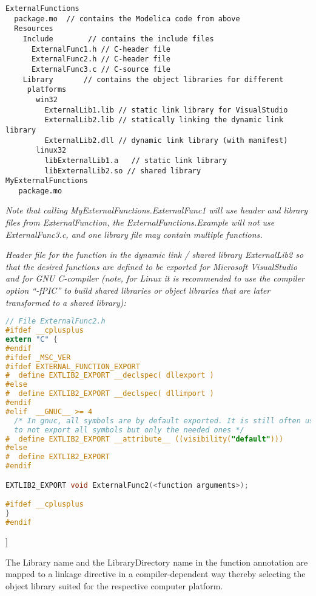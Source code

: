 \textbf{}

\begin{lstlisting}[language=modelica]
ExternalFunctions
  package.mo  // contains the Modelica code from above
  Resources
    Include        // contains the include files
      ExternalFunc1.h // C-header file
      ExternalFunc2.h // C-header file
      ExternalFunc3.c // C-source file
    Library       // contains the object libraries for different
     platforms
       win32
         ExternalLib1.lib // static link library for VisualStudio
         ExternalLib2.lib // statically linking the dynamic link library
         ExternalLib2.dll // dynamic link library (with manifest)
       linux32
         libExternalLib1.a   // static link library
         libExternalLib2.so // shared library
MyExternalFunctions
   package.mo
\end{lstlisting}
\emph{Note that calling MyExternalFunctions.ExternalFunc1 will use
header and library files from ExternalFunction, the ExternalFunctions.Example will not use ExternalFunc3.c,
and one library file may contain multiple functions.}

\emph{Header file for the function in the dynamic link / shared library
ExternalLib2 so that the desired functions are defined to be exported
for Microsoft VisualStudio and for GNU C-compiler (note, for Linux it is
recommended to use the compiler option ``-fPIC'' to build shared
libraries or object libraries that are later transformed to a shared
library):}

\begin{lstlisting}[language=C]
// File ExternalFunc2.h
#ifdef __cplusplus
extern "C" {
#endif
#ifdef _MSC_VER
#ifdef EXTERNAL_FUNCTION_EXPORT
#  define EXTLIB2_EXPORT __declspec( dllexport )
#else
#  define EXTLIB2_EXPORT __declspec( dllimport )
#endif
#elif  __GNUC__ >= 4
  /* In gnuc, all symbols are by default exported. It is still often useful,
  to not export all symbols but only the needed ones */
#  define EXTLIB2_EXPORT __attribute__ ((visibility("default")))
#else
#  define EXTLIB2_EXPORT
#endif

EXTLIB2_EXPORT void ExternalFunc2(<function arguments>);

#ifdef __cplusplus
}
#endif
\end{lstlisting}
{]}

The Library name and the LibraryDirectory name in the function
annotation are mapped to a linkage directive in a compiler-dependent way
thereby selecting the object library suited for the respective computer
platform.

